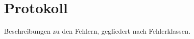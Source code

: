 %



\newpage



\section{Protokoll}
\label{Abschnitt:Programmfehler:Protokoll}

Beschreibungen zu den Fehlern, gegliedert nach Fehlerklassen.\\


